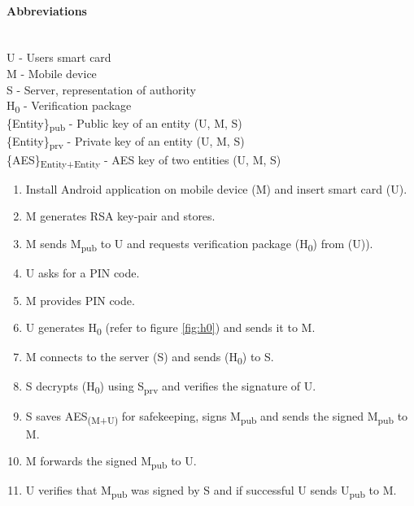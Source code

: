 \paragraph{Abbreviations}\mbox{}\\
U - Users smart card \\
M - Mobile device \\
S - Server, representation of authority \\
H\textsubscript{0} - Verification package \\
\{Entity\}\textsubscript{pub} - Public key of an entity (U, M, S)\\
\{Entity\}\textsubscript{prv} - Private key of an entity (U, M, S)\\
\{AES\}\textsubscript{Entity+Entity} - AES key of two entities (U, M, S)\\


\begin{enumerate}
  \item Install Android application on mobile device (M) and insert smart card (U).
  \item M generates RSA key-pair and stores.
  \item M sends M\textsubscript{pub} to U and requests verification package (H\textsubscript{0}) from (U)).
  \item U asks for a PIN code.
  \item M provides PIN code.
  \item U generates H\textsubscript{0} (refer to figure \ref{fig:h0}) and sends it to M.
  \item M connects to the server (S) and sends (H\textsubscript{0}) to S.
  \item S decrypts (H\textsubscript{0}) using S\textsubscript{prv} and verifies the signature of U.
  \item S saves AES\textsubscript{(M+U)} for safekeeping, signs M\textsubscript{pub} and sends the signed  M\textsubscript{pub} to M.
  \item M forwards the signed M\textsubscript{pub} to U.
  \item U verifies that M\textsubscript{pub} was signed by S and if successful U sends U\textsubscript{pub} to M.
\end{enumerate}

